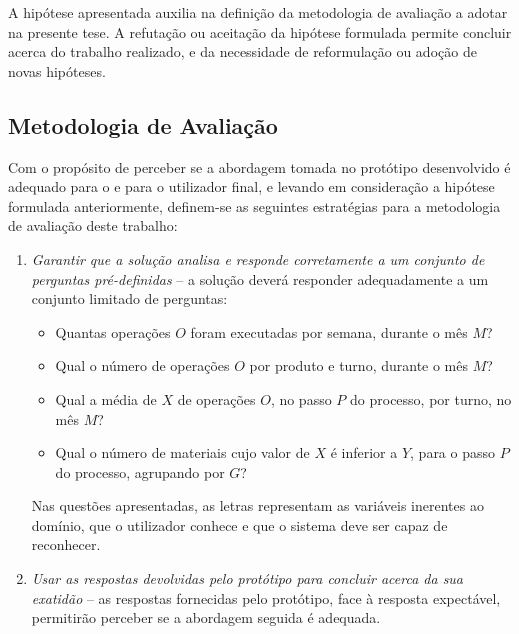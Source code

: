 A hipótese apresentada auxilia na definição da metodologia de avaliação a adotar na presente tese. A refutação ou aceitação da hipótese formulada permite concluir acerca do trabalho realizado, e da necessidade de reformulação ou adoção de novas hipóteses.

\subsection{Metodologia de Avaliação}
\label{sec:chap01_evaluationmethodologies}
Com o propósito de perceber se a abordagem tomada no protótipo desenvolvido é adequado para o {\productname} e para o utilizador final, e levando em consideração a hipótese formulada anteriormente, definem-se as seguintes estratégias para a metodologia de avaliação deste trabalho:

\begin{enumerate}
\label{enum:chap01_qualitystrategies}
    \item 
    {
        \textit{Garantir que a solução analisa e responde corretamente a um conjunto de perguntas pré-definidas} -- a solução deverá responder adequadamente a um conjunto limitado de perguntas:
        \begin{itemize}
            \item 
            {
                Quantas operações $O$ foram executadas por semana, durante o mês $M$?
            }
            \item
            {
                Qual o número de operações $O$ por produto e turno, durante o mês $M$?
            }
            \item
            {
                Qual a média de $X$ de operações $O$, no passo $P$ do processo, por turno, no mês $M$? 
            }
            \item
            {
                Qual o número de materiais cujo valor de $X$ é inferior a $Y$, para o passo $P$ do processo, agrupando por $G$?
            }
        \end{itemize}
        
        Nas questões apresentadas, as letras representam as variáveis inerentes ao domínio, que o utilizador conhece e que o sistema deve ser capaz de reconhecer.
    }
    \item
    {
        \textit{Usar as respostas devolvidas pelo protótipo para concluir acerca da sua exatidão} -- as respostas fornecidas pelo protótipo, face à resposta expectável, permitirão perceber se a abordagem seguida é adequada.
    }
\end{enumerate}


